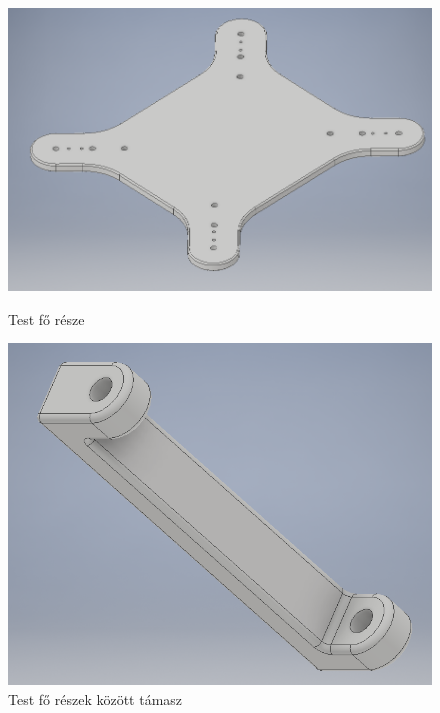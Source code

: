 \documentclass{article}
\begin{document}
\begin{figure}[h]
\centering
\begin{minipage}{0.3\textwidth}
	\centering
	\includegraphics[width=\textwidth]{testfo}
	\caption{Test fő része}
\end{minipage}\hfill
\begin{minipage}{0.3\textwidth}
	\centering
	\includegraphics[width=\textwidth]{testtarto}
	\caption{Test fő részek között támasz}
\end{minipage}\hfill
\begin{minipage}{0.3\textwidth}
	\centering

\end{minipage}
\end{figure}
\end{document}
